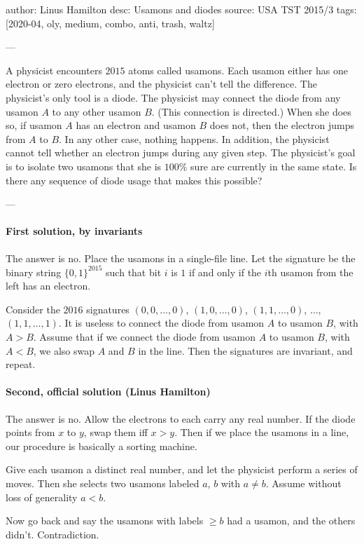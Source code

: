 author: Linus Hamilton
desc: Usamons and diodes
source: USA TST 2015/3
tags: [2020-04, oly, medium, combo, anti, trash, waltz]

---

A physicist encounters $2015$ atoms called usamons. Each usamon either has one electron or zero electrons, and the physicist can't tell the difference. The physicist's only tool is a diode. The physicist may connect the diode from any usamon $A$ to any other usamon $B$. (This connection is directed.) When she does so, if usamon $A$ has an electron and usamon $B$ does not, then the electron jumps from $A$ to $B$. In any other case, nothing happens. In addition, the physicist cannot tell whether an electron jumps during any given step. The physicist's goal is to isolate two usamons that she is $100\%$ sure are currently in the same state. Is there any sequence of diode usage that makes this possible?

---

\paragraph{First solution, by invariants} The answer is no. Place the usamons in a single-file line. Let the signature be the binary string $\{0,1\}^{2015}$ such that bit $i$ is $1$ if and only if the $i$th usamon from the left has an electron.

Consider the $2016$ signatures $(0,0,\ldots,0)$, $(1,0,\ldots,0)$, $(1,1,\ldots,0)$, $\ldots$, $(1,1,\ldots,1)$. It is useless to connect the diode from usamon $A$ to usamon $B$, with $A>B$. Assume that if we connect the diode from usamon $A$ to usamon $B$, with $A<B$, we also swap $A$ and $B$ in the line. Then the signatures are invariant, and repeat.

\paragraph{Second, official solution (Linus Hamilton)} The answer is no. Allow the electrons to each carry any real number. If the diode points from $x$ to $y$, swap them iff $x>y$. Then if we place the usamons in a line, our procedure is basically a sorting machine.

Give each usamon a distinct real number, and let the physicist perform a series of moves. Then she selects two usamons labeled $a$, $b$ with $a\ne b$. Assume without loss of generality $a<b$.

Now go back and say the usamons with labels $\ge b$ had a usamon, and the others didn't. Contradiction.
